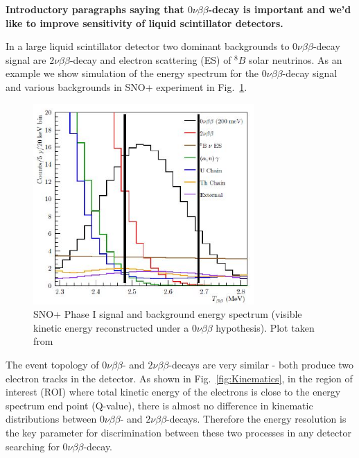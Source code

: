\documentclass[12pt,twoside,letterpaper]{article}
\newcommand{\vbb}{0\nu\beta\beta}
\newcommand{\vvbb}{2\nu\beta\beta}
\newcommand{\B}{^{8}B}
\begin{document}
{\bf Introductory paragraphs saying that $\vbb$-decay is important and we'd like to improve sensitivity of liquid scintillator detectors.}


In a large liquid scintillator detector two dominant backgrounds to $\vbb$-decay signal are $\vvbb$-decay and electron scattering (ES) of $\B$ solar neutrinos. As an example we show simulation of the energy spectrum for the $\vbb$-decay signal and various backgrounds in SNO+ experiment in Fig.~\ref{fig:SNOp_bkgs}.


\begin{figure}[htb]
\centering
\includegraphics[angle=0,width=0.75\textwidth]{plots/SNOp_backgrounds.JPG}
\caption{SNO+ Phase I signal and background energy spectrum (visible kinetic energy reconstructed under a $\vbb$ hypothesis). Plot taken from~\cite{SNOp_paper}}
\label{fig:SNOp_bkgs}
\end{figure}

The event topology of $\vbb$- and $\vvbb$-decays are very similar - both produce two electron tracks in the detector. As shown in Fig.~\ref{fig:Kinematics}, in the region of interest (ROI) where total kinetic energy of the electrons is close to the energy spectrum end point (Q-value), there is almost no difference in kinematic distributions between $\vbb$- and $\vvbb$-decays. Therefore the energy resolution is the key parameter for discrimination between these two processes in any detector searching for $\vbb$-decay.
\end{document}
